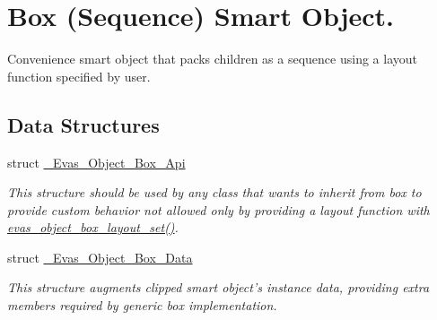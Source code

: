 \section{Box (Sequence) Smart Object.}
\label{group__Evas__Object__Box}


Convenience smart object that packs children as a sequence using a layout function specified by user.  


\subsection*{Data Structures}
\begin{DoxyCompactItemize}
\item 
struct \hyperlink{struct__Evas__Object__Box__Api}{\_\-Evas\_\-Object\_\-Box\_\-Api}
\begin{DoxyCompactList}\small\item\em This structure should be used by any class that wants to inherit from box to provide custom behavior not allowed only by providing a layout function with \hyperlink{group__Evas__Object__Box_ga2116d23c11ab08d7c50cbcb588de5570}{evas\_\-object\_\-box\_\-layout\_\-set()}. \item\end{DoxyCompactList}\item 
struct \hyperlink{struct__Evas__Object__Box__Data}{\_\-Evas\_\-Object\_\-Box\_\-Data}
\begin{DoxyCompactList}\small\item\em This structure augments clipped smart object's instance data, providing extra members required by generic box implementation. \item\end{DoxyCompactList}\end{DoxyCompactItemize}
